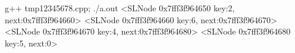 \begin{console} g++ tmp12345678.cpp; ./a.out
<SLNode 0x7fff3f964650 key:2, next:0x7fff3f964660>
<SLNode 0x7fff3f964660 key:6, next:0x7fff3f964670>
<SLNode 0x7fff3f964670 key:4, next:0x7fff3f964680>
<SLNode 0x7fff3f964680 key:5, next:0>
\end{console}

